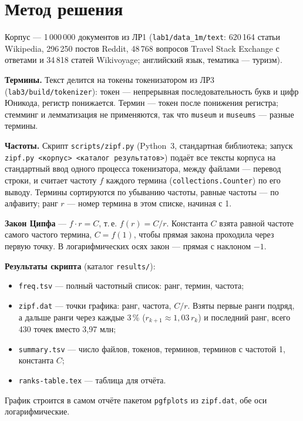 \pagebreak
\section{Метод решения}
Корпус --- 1\,000\,000 документов из ЛР1 (\texttt{lab1/data\_1m/text}: 620\,164 статьи Wikipedia, 296\,250 постов Reddit, 48\,768 вопросов Travel Stack Exchange с ответами и 34\,818 статей Wikivoyage; английский язык, тематика --- туризм).

\textbf{Термины.} Текст делится на токены токенизатором из ЛР3 (\texttt{lab3/build/tokenizer}): токен --- непрерывная последовательность букв и цифр Юникода, регистр понижается. Термин --- токен после понижения регистра; стемминг и лемматизация не применяются, так что \texttt{museum} и \texttt{museums} --- разные термины.

\textbf{Частоты.} Скрипт \texttt{scripts/zipf.py} (Python~3, стандартная библиотека; запуск \texttt{zipf.py <корпус> <каталог результатов>}) подаёт все тексты корпуса на стандартный ввод одного процесса токенизатора, между файлами --- перевод строки, и считает частоту $f$ каждого термина (\texttt{collections.Counter}) по его выводу. Термины сортируются по убыванию частоты, равные частоты --- по алфавиту; ранг $r$ --- номер термина в этом списке, начиная с 1.

\textbf{Закон Ципфа} --- $f \cdot r = C$, т.\,е. $f(r) = C / r$. Константа $C$ взята равной частоте самого частого термина, $C = f(1)$, чтобы прямая закона проходила через первую точку. В логарифмических осях закон --- прямая с наклоном $-1$.

\textbf{Результаты скрипта} (каталог \texttt{results/}):
\begin{itemize}
    \item \texttt{freq.tsv} --- полный частотный список: ранг, термин, частота;
    \item \texttt{zipf.dat} --- точки графика: ранг, частота, $C/r$. Взяты первые ранги подряд, а дальше ранги через каждые 3\,\% ($r_{k+1} \approx 1{,}03\,r_k$) и последний ранг, всего 430 точек вместо 3,97 млн;
    \item \texttt{summary.tsv} --- число файлов, токенов, терминов, терминов с частотой 1, константа $C$;
    \item \texttt{ranks-table.tex} --- таблица для отчёта.
\end{itemize}
График строится в самом отчёте пакетом \texttt{pgfplots} из \texttt{zipf.dat}, обе оси логарифмические.
